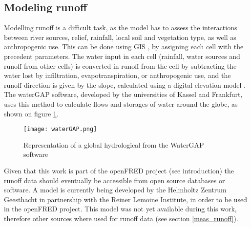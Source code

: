 \subsection{Modeling runoff}
Modelling runoff is a difficult task, as the model has to assess the interactions between river sources, relief, rainfall, local soil and vegetation type, as well as anthropogenic use. This can be done using GIS \cite{bayazit}, by assigning each cell with the precedent parameters. The water input in each cell (rainfall, water sources and runoff from other cells) is converted in runoff from the cell by subtracting the water lost by infiltration, evapotranspiration, or anthropogenic use, and the runoff direction is given by the slope, calculated using a digital elevation model \cite{heywood}. \newline
The waterGAP software, developed by the universities of Kassel and Frankfurt, uses this method to calculate flows and storages of water around the globe, as shown on figure \ref{waterGAP}.

\begin{figure}[H]
\texttt{[image: waterGAP.png]}
\caption[Representation of a global hydrological from the WaterGAP software]{Representation of a global hydrological from the WaterGAP software \cite{doll}}
\centering
\label{waterGAP}
\end{figure}

Given that this work is part of the openFRED project (see introduction) the runoff data should eventually be accessible from open source databases or software. A model is currently being developed by the Helmholtz Zentrum Geesthacht in partnership with the Reiner Lemoine Institute, in order to be used in the openFRED project. This model was not yet available during this work, therefore other sources where used for runoff data (see section \ref{meas_runoff}).

